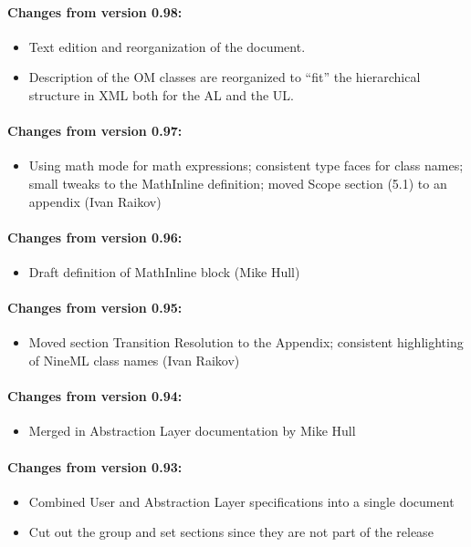 \documentclass{article}
\begin{document}
\paragraph{Changes from version 0.98:}
\begin{itemize}
\item Text edition and reorganization of the document.
\item Description of the OM classes are reorganized to ``fit'' the hierarchical
structure in XML both for the AL and the UL.
\end{itemize}

\paragraph{Changes from version 0.97:}
\begin{itemize}
\item Using math mode for math expressions; consistent type faces for
  class names; small tweaks to the MathInline definition; moved Scope
  section (5.1) to an appendix (Ivan Raikov)
\end{itemize}

\paragraph{Changes from version 0.96:}
\begin{itemize}
\item Draft definition of MathInline block (Mike Hull)
\end{itemize}

\paragraph{Changes from version 0.95:}
\begin{itemize}
\item Moved section Transition Resolution to the Appendix; consistent
  highlighting of NineML class names (Ivan Raikov)
\end{itemize}

\paragraph{Changes from version 0.94:}
\begin{itemize}
\item Merged in Abstraction Layer documentation by Mike Hull
\end{itemize}

\paragraph{Changes from version 0.93:}
\begin{itemize}
\item Combined User and Abstraction Layer specifications into a single document
\item Cut out the group and set sections since they are not part of the release
\end{itemize}
\end{document}
